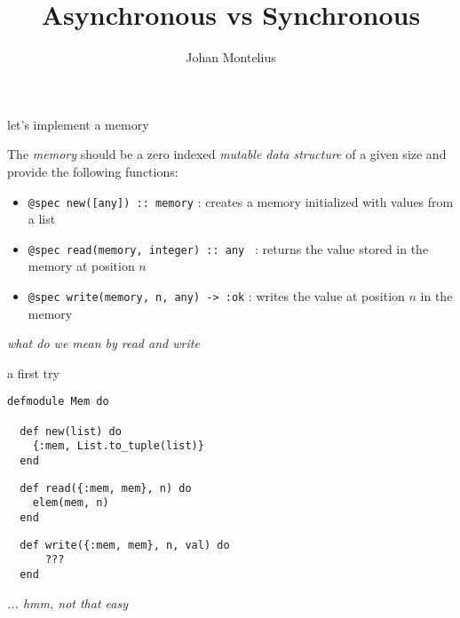 

\title[ID1019 Asynchronous]{Asynchronous vs Synchronous}


\author{Johan Montelius}
\date{\semester}



\begin{frame}
\titlepage
\end{frame}

\begin{frame}{let's implement a memory}

  The {\em memory} should be a zero indexed {\em mutable data
    structure} of a given size and provide the following functions:

\pause\vspace{20pt}

\begin{itemize}
 \item {\tt @spec new([any]) :: memory} : creates a memory initialized with values from a list \pause
 \item {\tt @spec read(memory, integer) :: any } : returns the  value stored in the memory at position $n$ 
 \item {\tt @spec write(memory, n, any) -> :ok} : writes the value at position $n$ in the memory 
\end{itemize}

\pause\vspace{20pt}
{\em what do we mean by read and write}

\end{frame}

\begin{frame}[fragile]{a first try}

\begin{verbatim}
defmodule Mem do

  def new(list) do
    {:mem, List.to_tuple(list)}
  end
\end{verbatim} \pause
\begin{verbatim}
  def read({:mem, mem}, n) do
    elem(mem, n)
  end
\end{verbatim} \pause
\begin{verbatim}
  def write({:mem, mem}, n, val) do
      ???
  end 
\end{verbatim}

\pause\vspace{20pt}
{\em ... hmm, not that easy}

\end{frame}

